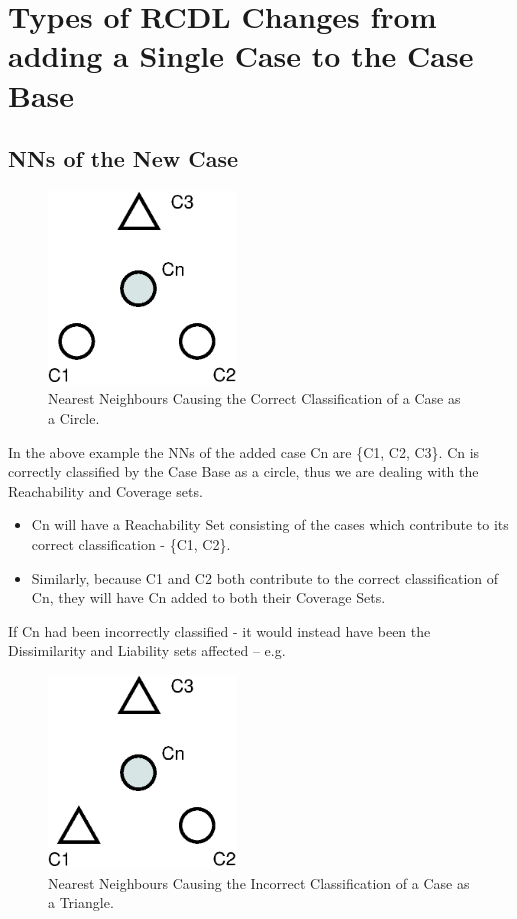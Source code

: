 \documentclass[a4paper,11pt]{report}
\begin{document}

\section{Types of RCDL Changes from adding a Single Case to the Case Base}
\subsection{NNs of the New Case}
\begin{figure}[h!]
  \centering
	\includegraphics[width=5cm]{./Drawn/NNsCorrectlyClassify}
\caption{Nearest Neighbours Causing the Correct Classification of a Case as a Circle.}
\label{fig:NNsCorrect}
\end{figure}

In the above example the NNs of the added case Cn are \{C1, C2, C3\}. Cn is correctly classified by the Case Base as a circle, thus we are dealing with the Reachability and Coverage sets.
\begin{itemize}
	\item Cn will have a Reachability Set consisting of the cases which contribute to its correct classification - \{C1, C2\}.
	\item Similarly, because C1 and C2 both contribute to the correct classification of Cn, they will have Cn added to both their Coverage Sets.
\end{itemize}

If Cn had been incorrectly classified - it would instead have been the Dissimilarity and Liability sets affected – e.g.

\begin{figure}[h!]
  \centering
	\includegraphics[width=5cm]{./Drawn/NNsIncorrectlyClassify}
\caption{Nearest Neighbours Causing the Incorrect Classification of a Case as a Triangle.}

\end{figure}
\end{document}
